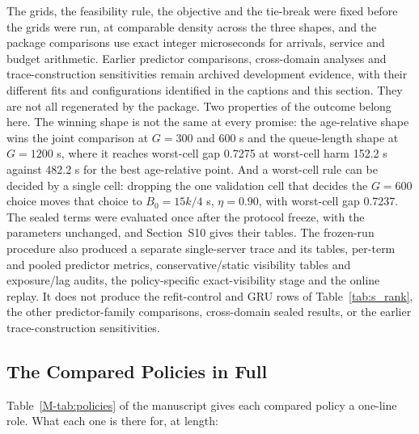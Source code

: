 \documentclass[mathematics,supfile,submit,moreauthors]{Definitions/mdpi}
\newcommand{\devnum}[1]{#1}
\begin{document}
The grids, the feasibility rule, the objective and the tie-break were fixed before the
grids were run, at comparable density across the three shapes, and the package comparisons use exact integer microseconds for arrivals, service
and budget arithmetic. Earlier predictor comparisons, cross-domain analyses and
trace-construction sensitivities remain archived development evidence, with their
different fits and configurations identified in the captions and this section. They are not all regenerated by the package. Two properties of the outcome belong here. The winning shape is not the same at
every promise: the age-relative
shape wins the joint comparison at $G = \devnum{300}$ and $\devnum{600}$ s and the queue-length
shape at $G = \devnum{1200}$ s, where it reaches worst-cell gap \devnum{0.7275} at worst-cell
harm \devnum{152.2} s against \devnum{482.2} s for the best age-relative point. And a worst-cell
rule can be decided by a single cell: dropping the one validation cell that decides
the $G = \devnum{600}$ choice moves that choice to $B_0 = \devnum{15}k/4$ s, $\eta =
\devnum{0.90}$, with worst-cell gap \devnum{0.7237}. The sealed terms were evaluated
once after the protocol freeze, with the parameters unchanged, and Section~S10 gives
their tables. The frozen-run procedure also produced a separate single-server trace
and its tables, per-term and pooled predictor metrics, conservative/static visibility
tables and exposure/lag audits, the policy-specific exact-visibility stage and the
online replay. It does not produce the refit-control and GRU rows of
Table~\ref{tab:s_rank}, the other predictor-family comparisons, cross-domain sealed
results, or the earlier trace-construction sensitivities.


\subsection{The Compared Policies in Full}
\label{sec:supp_policies}

Table~\ref*{M-tab:policies} of the manuscript gives each compared policy a one-line role. What each one is
there for, at length:
\end{document}
